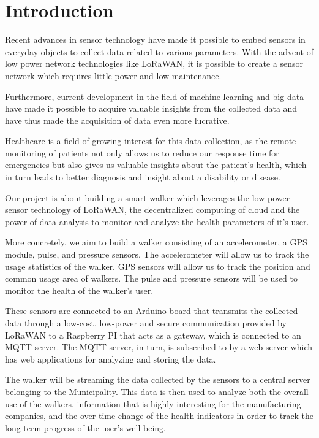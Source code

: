 \chapter{Introduction}
\label{cha:introduction}

Recent advances in sensor technology have made it possible to embed sensors in everyday objects to collect data related to various parameters. With the advent of low power network technologies like LoRaWAN, it is possible to create a sensor network which requires little power and low maintenance.

Furthermore, current development in the field of machine learning and big data have made it possible to acquire valuable insights from the collected data and have thus made the acquisition of data even more lucrative.

Healthcare is a field of growing interest for this data collection, as the remote monitoring of patients not only allows us to reduce our response time for emergencies but also gives us valuable insights about the patient's health, which in turn leads to better diagnosis and insight about a disability or disease.

Our project is about building a smart walker which leverages the low power sensor technology of LoRaWAN, the decentralized computing of cloud and the power of data analysis to monitor and analyze the health parameters of it's user.


More concretely, we aim to build a walker consisting of an accelerometer, a GPS module, pulse, and pressure sensors. The accelerometer will allow us to track the usage statistics of the walker. GPS sensors will allow us to track the position and common usage area of walkers. The pulse and pressure sensors will be used to monitor the health of the walker's user.


These sensors are connected to an Arduino board that transmits the collected data through a low-cost, low-power and secure communication provided by LoRaWAN to a Raspberry PI that acts as a gateway, which is connected to an MQTT server. The MQTT server, in turn, is subscribed to by a web server which has web applications for analyzing and storing the data.


The walker will be streaming the data collected by the sensors to a central server belonging to the Municipality. This data is then used to analyze both the overall use of the walkers, information that is highly interesting for the manufacturing companies, and the over-time change of the health indicators in order to track the long-term progress of the user's well-being.

